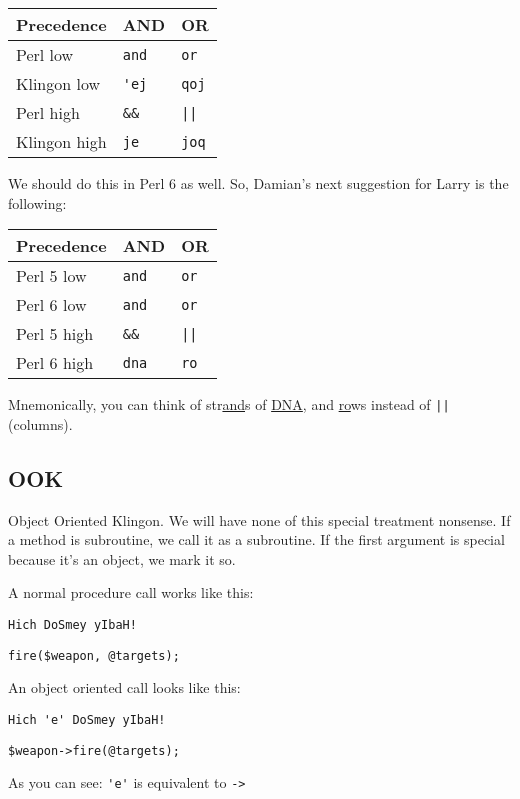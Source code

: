 \documentclass{article}
\begin{document}
\begin{center}
\begin{tabular}{l|l|l}
\multicolumn{1}{c|}{Precedence} & \multicolumn{1}{c|}{AND}
& \multicolumn{1}{c}{OR}\\\hline
Perl low     & \verb"and" & \verb"or"\\
Klingon low  & \verb"'ej" & \verb"qoj"\\
Perl high    & \verb"&&"  & \verb"||"\\
Klingon high & \verb"je"  & \verb"joq"\\
\end{tabular}
\end{center}
We should do this in Perl 6 as well.  So, Damian's next
suggestion for Larry is the following:
\begin{center}
\begin{tabular}{l|l|l}
\multicolumn{1}{c|}{Precedence} & \multicolumn{1}{c|}{AND}
& \multicolumn{1}{c}{OR}\\\hline
Perl 5 low   & \verb"and" & \verb"or"\\
Perl 6 low   & \verb"and" & \verb"or"\\
Perl 5 high  & \verb"&&"  & \verb"||"\\
Perl 6 high  & \verb"dna" & \verb"ro"\\
\end{tabular}
\end{center}
Mnemonically, you can think of str\underline{and}s of \underline{DNA},
and \underline{ro}ws instead of \verb"||" (columns).


\subsection{OOK}
Object Oriented Klingon.  We will have none of this special treatment
nonsense.  If a method is subroutine, we call it as a subroutine.  If
the first argument is special because it's an object, we mark it so.

\noindent A normal procedure call works like this:

\verb"Hich DoSmey yIbaH!"

\verb"fire($weapon, @targets);"

\noindent An object oriented call looks like this:

\verb"Hich 'e' DoSmey yIbaH!"

\verb"$weapon->fire(@targets);"

\noindent As you can see: \verb"'e'" is equivalent to \verb"->"
\end{document}
